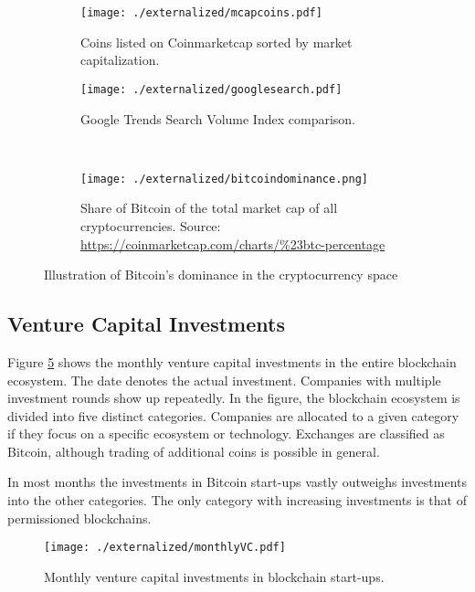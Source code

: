 \begin{figure}[ht]
  \centering
  \begin{subfigure}[t]{0.45\linewidth}
    \centering
	\texttt{[image: ./externalized/mcapcoins.pdf]}
	\caption{Coins listed on Coinmarketcap sorted by market capitalization.}
	\label{fig:eco:mcap}
  \end{subfigure}
  \begin{subfigure}[t]{0.45\linewidth}
  	\centering
	\texttt{[image: ./externalized/googlesearch.pdf]}
	\caption{Google Trends Search Volume Index comparison.}
	\label{fig:eco:googlesearch}
  \end{subfigure}%
  \\
  \begin{subfigure}[t]{0.95\linewidth}
  	\centering
	\texttt{[image: ./externalized/bitcoindominance.png]}
	\caption{Share of Bitcoin of the total market cap of all cryptocurrencies. Source: 
	\url{https://coinmarketcap.com/charts/\%23btc-percentage}}
	\label{fig:eco:bitcoindominance}
  \end{subfigure}%
  \caption{Illustration of Bitcoin's dominance in the cryptocurrency space}
\end{figure}


\subsection{Venture Capital Investments}

Figure \ref{fig:eco:vcfund} shows the monthly venture capital investments in the entire blockchain ecosystem. The date denotes the actual investment. Companies with multiple investment rounds show up repeatedly. In the figure, the blockchain ecosystem is divided into five distinct categories. Companies are allocated to a given category if they focus on a specific ecosystem or technology. Exchanges are classified as Bitcoin, although trading of additional coins is possible in general. 

In most months the investments in Bitcoin start-ups vastly outweighs investments into the other categories. The only category with increasing investments is that of permissioned blockchains.
\begin{figure}[ht]
\centering
\texttt{[image: ./externalized/monthlyVC.pdf]}
\caption{Monthly venture capital investments in blockchain start-ups.}
\label{fig:eco:vcfund}
\end{figure}

